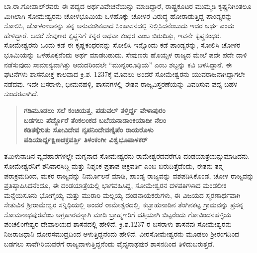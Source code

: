 ಬಾ.ರಾ.ಗೋಪಾಲ್​ರವರು ಈ ಪದ್ಯದ ಅರ್ಥವಿವೇಚನೆಯನ್ನು ಮಾಡಿದ್ದಾರೆ, ರಾಷ್ಟ್ರಕೂಟರ ಮುಮ್ಮಡಿ ಕೃಷ್ಣ\-ನಿಗಿಂತಲೂ ಮಿಗಿಲಾಗಿ ಸೋಮೇಶ್ವರನು ಚೋಳಭೂಮಿಯ ಒಳಹೊಕ್ಕು ಚೋಳರ ವಿರುದ್ಧ ಹೋರಾಡುತ್ತಿದ್ದ ಪಾಂಡ್ಯರನ್ನು ಸೋಲಿಸಿ, ಚೋಳರಾಜನನ್ನು ತನ್ನ ಅನುವಂಶಿಕವಾದ ಸಿಂಹಾಸನದಲ್ಲಿ ನಿಲ್ಲಿಸಿದನೆಂಬುದು ಇದರ ಅರ್ಥ ಎಂದು ಹೇಳಿದ್ದಾರೆ. ಆದರೆ ಸೇವುಣರ ಕೃಷ್ಣನಿಗೆ ಕನ್ನರ ಅಥವಾ ಕಂಧರ ಎಂಬ ಬಿರುದಿತ್ತು, ಇವನೇ ಕೃಷ್ಣಕಂಧರ. ಸೋಮೇಶ್ವರನು ಒಂದು ಕಡೆ ಈ ಕೃಷ್ಣಕಂಧರನನ್ನು ಸೋಲಿಸಿ ಇನ್ನೊಂದು ಕಡೆ ಪಾಂಡ್ಯರನ್ನು, ಸೋಲಿಸಿ ಚೋಳರ ಭೂಮಿಯನ್ನು ಒಳಹೊಕ್ಕನೆಂದು ಅರ್ಥ ಮಾಡಬಹುದು. ಸೇವುಣರು ಹೊಯ್ಸಳ ರಾಜ್ಯದ ಮೇಲೆ ಪದೇ ಪದೇ ದಾಳಿ ನಡೆಸುವುದು ಸಾಮಾನ್ಯವಾಗಿತ್ತು ಆದುದರಿಂದಲೇ “ಮುನ್ನಂರೂಢಿಯ” ಎಂಬ ಶಬ್ದನ್ನು ಕವಿ ಬಳಸಿದ್ದಾನೆ. ಈ ಘಟನೆಗಳು ಶಾಸನೋಕ್ತ ಕಾಲವಾದ ಕ್ರಿ.ಶ. 1237ಕ್ಕೆ ಮೊದಲು ಅಂದರೆ ಸೋಮೇಶ್ವರನು ಯುವರಾಜನಾಗಿದ್ದಾಗಲೇ ನಡೆದವು. ಇದೇ ಬಸರಾಳು, ಭೀಮನಹಳ್ಳಿ, ಶಾಸನಗಳಲ್ಲಿ ಈತನ ರಾಜ್ಯವಿಸ್ತರಣೆಯನ್ನು ವಿವರಿಸುವ ಪದ್ಯ ಬಹಳ ಸುಂದರವಾಗಿದೆ.

\begin{verse}
\textbf{ಗಡಿಮೂಡಲು ಸಲೆ ಕಂಚಿಯತ್ತ, ಪಡುವಲ್​ ತಳ್ತಿರ್ದ್ದ ವೇಳಾಪುರಂ} \\\textbf{ಬಡಗಲು ಪೆರ್ದ್ದೊರೆ ತೆಂಕಲಂಕದ ಬಬೆಯನಾಡಾಂಕಿಯಾದೀ ನೆಲಂ} \\\textbf{ಕಡಿತಕ್ಕೇರಿತು ಸೋವಿದೇವ ನೃಪನಿಂದೇವಣ್ನಿಪೆಂ ರಾಯರೊಳು} \\\textbf{ಪಡಿಯಾರ್ದ್ದಕ್ಷಿಣಚಕ್ರವರ್ತ್ತಿ ತಿಳಂಕಂಗೀ ವಿಶ್ವಭೂಪಾಳಕರ್​}
\end{verse}

ತಮಿಳುನಾಡಿನ ವ್ಯವಹಾರಗಳಲ್ಲೇ ಮಗ್ನನಾದ ಸೋಮೇಶ್ವರನು ರಾಮೇಶ್ವರದವರೆಗೂ ದಂಡಯಾತ್ರೆಯನ್ನು\break ಮಾಡಿದನು. ಸೋಮೇಶ್ವರನಿಗೆ ಶನಿವಾರಸಿದ್ಧಿ ಮತ್ತು ನಿಶ್ಶಂಕ ಪ್ರತಾಪ ಚಕ್ರವರ್ತಿ ಎಂಬ ಬಿರುದಿತ್ತೆದೆಂದು, ಈತನು ತನ್ನ ಪರಾಕ್ರಮದಿಂದ, ಮಕರ ರಾಜ್ಯವನ್ನು ನಿರ್ಮೂಲನೆ ಮಾಡಿ, ಪಾಂಡ್ಯ ರಾಜ್ಯವನ್ನು ವಶಪಡಿಸಿಕೊಂಡ, ಚೋಳ ರಾಜ್ಯವನ್ನು ಪ್ರತಿಷ್ಠಾಪಿಸಿದನೆಂದೂ, ಈ ದಂಡಯಾತ್ರೆಯಲ್ಲಿ ಭಾಗವಹಿಸಿದ್ದ, ಸೋಮೇಶ್ವರನ ದಳಪತಿಗಳಾದ ಮಂಡಲೀಕ ಮನ್ನೆಯಸೂನು ಭೋಗೈಯ್ಯ ಮತ್ತು ಮುರಾರಿ ಮಲ್ಲಯ್ಯ ದಂಡನಾಯಕರುಗಳು, ಈ ವಿಜಯದ ಸ್ಮರಣಾರ್ಥವಾಗಿ ಸೇತುವಿನ ಶ‍್ರೀರಾಮೇಶ್ವರ ಸನ್ನಿಧಿಯಲ್ಲಿ ಅಂದರೆ ರಾಮೇಶ್ವರದಲ್ಲಿ, ಕಬ್ಬಾಹುನಾಡಿನ ತೆಂಗಿನಕಟ್ಟ ಗ್ರಾಮವನ್ನು ಪ್ರಸನ್ನ ಸೋಮನಾಥಪುರವೆಂಬ ಅಗ್ರಹಾರವನ್ನಾಗಿ ಮಾಡಿ ಬ್ರಾಹ್ಮಣರಿಗೆ ದತ್ತಿಯಾಗಿ ಬಿಟ್ಟರೆಂದು ಗೋವಿಂದನಹಳ್ಳಿಯ ಪಂಚಲಿಂಗೇಶ್ವರ ದೇವಾಲಯದ ಶಾಸನದಲ್ಲಿ ಹೇಳಿದೆ. ಕ್ರಿ.ಶ.1237 ರ ಬಸರಾಳು ಶಾಸನವು ಸೋಮೇಶ್ವರನು ನಿಜರಾಜಧಾನಿ ದೋರಸಮುದ್ರ\-ದಿಂದ ಆಳುತ್ತಿದ್ದನೆಂದು ಹೇಳಿದೆ. ವೀರಸೋಮೇಶ್ವರನು ಮೂಡಲು ಶ‍್ರೀರಂಗದಿಂದ ಬಡಗಲು ಸಾವೆಗಿರಿಯವರೆಗೆ ರಾಜ್ಯವಾಳುತ್ತಿದ್ದನೆಂದು ವೈದ್ಯನಾಥಪುರ ಶಾಸನದಿಂದ ತಿಳಿದುಬರುತ್ತದೆ.

